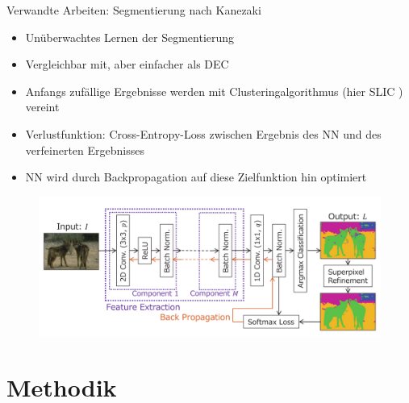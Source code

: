 \documentclass{beamer}
\begin{document}
\begin{frame}[allowframebreaks]{Verwandte Arbeiten: Segmentierung nach Kanezaki \cite{kanezaki_18}}
	\begin{itemize}
		\item Unüberwachtes Lernen der Segmentierung
		\item Vergleichbar mit, aber einfacher als DEC
		\item Anfangs zufällige Ergebnisse werden mit Clusteringalgorithmus (hier SLIC \cite{achanta_10}) vereint
		\item Verlustfunktion: Cross-Entropy-Loss zwischen Ergebnis des NN und des verfeinerten Ergebnisses
		\item NN wird durch Backpropagation auf diese Zielfunktion hin optimiert
	\end{itemize}
	\newpage
	\begin{figure}
		\includegraphics[height=20ex,keepaspectratio]{gfx/Kan18_01.png}
	\end{figure}
\end{frame}

\section{Methodik}
\end{document}
